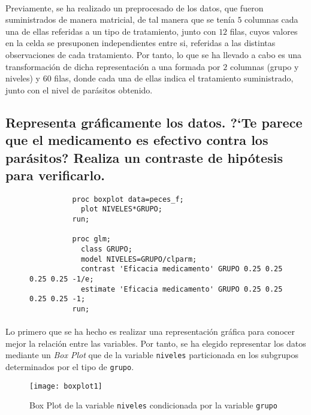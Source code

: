 \documentclass{article}
\begin{document}
    \paragraph{}
    Previamente, se ha realizado un preprocesado de los datos, que fueron suministrados de manera matricial, de tal manera que se tenía $5$ columnas cada una de ellas referidas a un tipo de tratamiento, junto con $12$ filas, cuyos valores en la celda se presuponen independientes entre si, referidas a las distintas observaciones de cada tratamiento. Por tanto, lo que se ha llevado a cabo es una transformación de dicha representación a una formada por $2$ columnas (grupo y niveles) y $60$ filas, donde cada una de ellas indica el tratamiento suministrado, junto con el nivel de parásitos obtenido.

    \subsection{Representa gráficamente los datos. ?`Te parece que el medicamento es efectivo contra los parásitos? Realiza un contraste de hipótesis para verificarlo.}

      \begin{figure}[h]
        \centering
        \begin{verbatim}
          proc boxplot data=peces_f;
            plot NIVELES*GRUPO;
          run;

          proc glm;
            class GRUPO;
            model NIVELES=GRUPO/clparm;
            contrast 'Eficacia medicamento' GRUPO 0.25 0.25 0.25 0.25 -1/e;
            estimate 'Eficacia medicamento' GRUPO 0.25 0.25 0.25 0.25 -1;
          run;
        \end{verbatim}
        \label{code:sas_3}
      \end{figure}

      \paragraph{}
      Lo primero que se ha hecho es realizar una representación gráfica para conocer mejor la relación entre las variables. Por tanto, se ha elegido representar los datos mediante un \emph{Box Plot} que de la variable \texttt{niveles} particionada en los subgrupos determinados por el tipo de \texttt{grupo}.

      \begin{figure}[H]
        \centering
        \texttt{[image: boxplot1]}
        \caption{Box Plot de la variable \texttt{niveles} condicionada por la variable \texttt{grupo}}
        \label{fig:figura_1}
      \end{figure}
\end{document}
